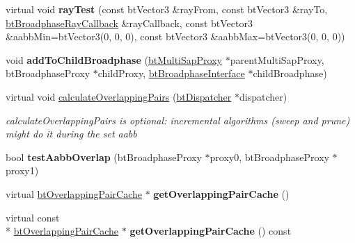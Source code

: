 \begin{DoxyCompactItemize}
\item 
\hypertarget{classbt_multi_sap_broadphase_a9b9c84e52caffd481ffccee3d6ac9b83}{virtual void {\bfseries ray\+Test} (const bt\+Vector3 \&ray\+From, const bt\+Vector3 \&ray\+To, \hyperlink{structbt_broadphase_ray_callback}{bt\+Broadphase\+Ray\+Callback} \&ray\+Callback, const bt\+Vector3 \&aabb\+Min=bt\+Vector3(0, 0, 0), const bt\+Vector3 \&aabb\+Max=bt\+Vector3(0, 0, 0))}\label{classbt_multi_sap_broadphase_a9b9c84e52caffd481ffccee3d6ac9b83}

\item 
\hypertarget{classbt_multi_sap_broadphase_a96ca3208c2bf2610ce76a168f7bb62c5}{void {\bfseries add\+To\+Child\+Broadphase} (\hyperlink{structbt_multi_sap_broadphase_1_1bt_multi_sap_proxy}{bt\+Multi\+Sap\+Proxy} $\ast$parent\+Multi\+Sap\+Proxy, bt\+Broadphase\+Proxy $\ast$child\+Proxy, \hyperlink{classbt_broadphase_interface}{bt\+Broadphase\+Interface} $\ast$child\+Broadphase)}\label{classbt_multi_sap_broadphase_a96ca3208c2bf2610ce76a168f7bb62c5}

\item 
virtual void \hyperlink{classbt_multi_sap_broadphase_a922708408ba589a5ab9b487c679ff6fb}{calculate\+Overlapping\+Pairs} (\hyperlink{classbt_dispatcher}{bt\+Dispatcher} $\ast$dispatcher)
\begin{DoxyCompactList}\small\item\em calculate\+Overlapping\+Pairs is optional\+: incremental algorithms (sweep and prune) might do it during the set aabb \end{DoxyCompactList}\item 
\hypertarget{classbt_multi_sap_broadphase_a38bcbcf1378407f7c748d24cc276f3b1}{bool {\bfseries test\+Aabb\+Overlap} (bt\+Broadphase\+Proxy $\ast$proxy0, bt\+Broadphase\+Proxy $\ast$proxy1)}\label{classbt_multi_sap_broadphase_a38bcbcf1378407f7c748d24cc276f3b1}

\item 
\hypertarget{classbt_multi_sap_broadphase_a081272661ef30baa9942de6ce385465e}{virtual \hyperlink{classbt_overlapping_pair_cache}{bt\+Overlapping\+Pair\+Cache} $\ast$ {\bfseries get\+Overlapping\+Pair\+Cache} ()}\label{classbt_multi_sap_broadphase_a081272661ef30baa9942de6ce385465e}

\item 
\hypertarget{classbt_multi_sap_broadphase_a74334cf9d9d005811bb7af889fa0ab12}{virtual const \\*
\hyperlink{classbt_overlapping_pair_cache}{bt\+Overlapping\+Pair\+Cache} $\ast$ {\bfseries get\+Overlapping\+Pair\+Cache} () const }\label{classbt_multi_sap_broadphase_a74334cf9d9d005811bb7af889fa0ab12}


\end{DoxyCompactItemize}
